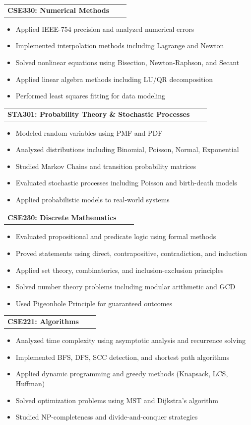 \documentclass[a4paper,12pt]{article}
\makeatletter
\newenvironment{joblong}[2]
    {
    \begin{tabularx}{\linewidth}{@{}l X r@{}}
    \textbf{#1} & \hfill &  #2 \\[3.75pt]
    \end{tabularx}
    \begin{minipage}[t]{\linewidth}
    \begin{itemize}[nosep,after=\strut, leftmargin=1em, itemsep=3pt,label=--]
    }
    {
    \end{itemize}
    \end{minipage}    
    }
\makeatother
\begin{document}
\begin{joblong}{CSE330: Numerical Methods}{}
\item Applied IEEE-754 precision and analyzed numerical errors
\item Implemented interpolation methods including Lagrange and Newton
\item Solved nonlinear equations using Bisection, Newton-Raphson, and Secant
\item Applied linear algebra methods including LU/QR decomposition
\item Performed least squares fitting for data modeling
\end{joblong}

\begin{joblong}{STA301: Probability Theory \& Stochastic Processes}{}
\item Modeled random variables using PMF and PDF
\item Analyzed distributions including Binomial, Poisson, Normal, Exponential
\item Studied Markov Chains and transition probability matrices
\item Evaluated stochastic processes including Poisson and birth-death models
\item Applied probabilistic models to real-world systems
\end{joblong}

\begin{joblong}{CSE230: Discrete Mathematics}{}
\item Evaluated propositional and predicate logic using formal methods
\item Proved statements using direct, contrapositive, contradiction, and induction
\item Applied set theory, combinatorics, and inclusion-exclusion principles
\item Solved number theory problems including modular arithmetic and GCD
\item Used Pigeonhole Principle for guaranteed outcomes
\end{joblong}

\begin{joblong}{CSE221: Algorithms}{}
\item Analyzed time complexity using asymptotic analysis and recurrence solving
\item Implemented BFS, DFS, SCC detection, and shortest path algorithms
\item Applied dynamic programming and greedy methods (Knapsack, LCS, Huffman)
\item Solved optimization problems using MST and Dijkstra’s algorithm
\item Studied NP-completeness and divide-and-conquer strategies
\end{joblong}
\end{document}
